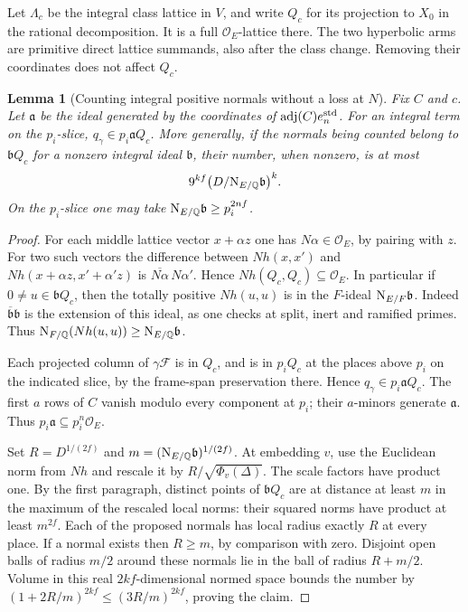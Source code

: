 \documentclass[a4paper,11pt]{article}
\newtheorem{lemma}[proposition]{Lemma}
\theoremstyle{definition}
\theoremstyle{remark}
\numberwithin{equation}{section}
\begin{document}
Let \(\Lambda_c\) be the integral class lattice in \(V\), and
write \(Q_c\) for its projection to \(X_0\) in the rational
decomposition. It is a full \(\mathcal O_E\)-lattice there.
The two hyperbolic arms are primitive direct lattice summands,
also after the class change. Removing their coordinates does
not affect \(Q_c\).

\begin{lemma}[Counting integral positive normals without a loss at \(N\)]
\leavevmode\label{lem:normalcount686}
Fix \(C\) and \(c\). Let \(\mathfrak a\) be the ideal generated
by the coordinates of \(\operatorname{adj}(C)e_n^{\rm std}\).
For an integral term on the \(p_i\)-slice,
\(q_\gamma\in p_i\mathfrak a Q_c\). More generally, if the
normals being counted belong to \(\mathfrak b Q_c\) for a
nonzero integral ideal \(\mathfrak b\), their number, when
nonzero, is at most
\[
      9^{kf}\big(D/{\rm N}_{E/\mathbb Q}\mathfrak b\big)^k .
\]
On the \(p_i\)-slice one may take
\({\rm N}_{E/\mathbb Q}\mathfrak b\ge p_i^{2nf}\).
\end{lemma}
\begin{proof}
For each middle lattice vector \(x+\alpha z\) one has
\(N\alpha\in\mathcal O_E\), by pairing with \(z\).
For two such vectors the difference between \(N h(x,x')\)
and \(N h(x+\alpha z,x'+\alpha' z)\) is
\(\overline{N\alpha}\,N\alpha'\). Hence
\(N h(Q_c,Q_c)\subseteq\mathcal O_E\). In particular if
\(0\ne u\in\mathfrak bQ_c\), then the totally positive
\(Nh(u,u)\) is in the \(F\)-ideal
\({\rm N}_{E/F}\mathfrak b\). Indeed
\(\overline{\mathfrak b}\mathfrak b\) is the extension of this
ideal, as one checks at split, inert and ramified primes.
Thus \({\rm N}_{F/\mathbb Q}(Nh(u,u))\ge
{\rm N}_{E/\mathbb Q}\mathfrak b\).

Each projected column of \(\gamma\mathcal F\) is in \(Q_c\),
and is in \(p_iQ_c\) at the places above \(p_i\) on the indicated
slice, by the frame-span preservation there. Hence
\(q_\gamma\in p_i\mathfrak a Q_c\). The first \(a\) rows of \(C\)
vanish modulo every component at \(p_i\); their \(a\)-minors
generate \(\mathfrak a\). Thus
\(p_i\mathfrak a\subseteq p_i^n\mathcal O_E\).

Set \(R=D^{1/(2f)}\) and
\(m=({\rm N}_{E/\mathbb Q}\mathfrak b)^{1/(2f)}\).
At embedding \(v\), use the Euclidean norm from \(Nh\)
and rescale it by \(R/\sqrt{\Phi_v(\Delta)}\). The scale
factors have product one. By the first paragraph, distinct
points of \(\mathfrak bQ_c\) are at distance at least \(m\)
in the maximum of the rescaled local norms: their squared
norms have product at least \(m^{2f}\). Each of the proposed
normals has local radius exactly \(R\) at every place. If a
normal exists then \(R\ge m\), by comparison with zero.
Disjoint open balls of radius \(m/2\) around these normals
lie in the ball of radius \(R+m/2\). Volume in this real
\(2kf\)-dimensional normed space bounds the number by
\((1+2R/m)^{2kf}\le(3R/m)^{2kf}\), proving the claim.
\end{proof}
\end{document}
